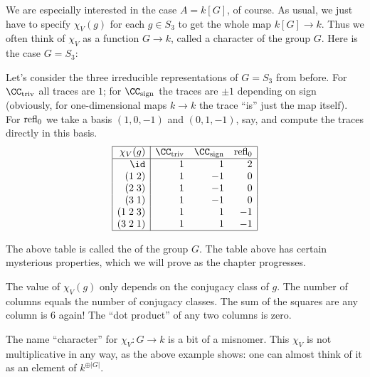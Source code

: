 We are especially interested in the case $A = k[G]$, of course.
As usual, we just have to specify $\chi_V(g)$ for each
$g \in S_3$ to get the whole map $k[G] \to k$.
Thus we often think of $\chi_V$ as a function $G \to k$,
called a character of the group $G$.
Here is the case $G = S_3$:
\begin{example}
	Let's consider the three irreducible representations
	of $G = S_3$ from before.
	For $\CC_{\text{triv}}$ all traces are $1$;
	for $\CC_{\text{sign}}$ the traces are $\pm 1$ depending on sign
	(obviously, for one-dimensional maps $k \to k$ the trace ``is''
	just the map itself).
	For $\operatorname{refl}_0$ we take a basis $(1,0,-1)$ and $(0,1,-1)$, say,
	and compute the traces directly in this basis.
	\[
		\begin{array}{|r|rrr|}
			\hline
			\chi_V(g) & \CC_{\text{triv}} & \CC_{\text{sign}} & \refl_0 \\ \hline
			\id & 1 & 1 & 2 \\
			(1 \; 2) & 1 & -1 & 0 \\
			(2 \; 3) & 1 & -1 & 0 \\
			(3 \; 1) & 1 & -1 & 0 \\
			(1 \; 2 \; 3) & 1 & 1 & -1 \\
			(3 \; 2 \; 1) & 1 & 1 & -1 \\ \hline
		\end{array}
	\]
\end{example}
The above table is called the  of the group $G$.
The table above has certain mysterious properties,
which we will prove as the chapter progresses.
\begin{enumerate}[(I)]
	\ii The value of $\chi_V(g)$ only depends on the conjugacy class of $g$.
	\ii The number of columns equals the number of conjugacy classes.
	\ii The sum of the squares are any column is $6$ again!
	\ii The ``dot product'' of any two columns is zero.
\end{enumerate}

\begin{abuse}
	The name ``character'' for $\chi_V : G \to k$ is a bit of a misnomer.
	This $\chi_V$ is not multiplicative in any way,
	as the above example shows: one can almost think of it as
	an element of $k^{\oplus |G|}$.
\end{abuse}


